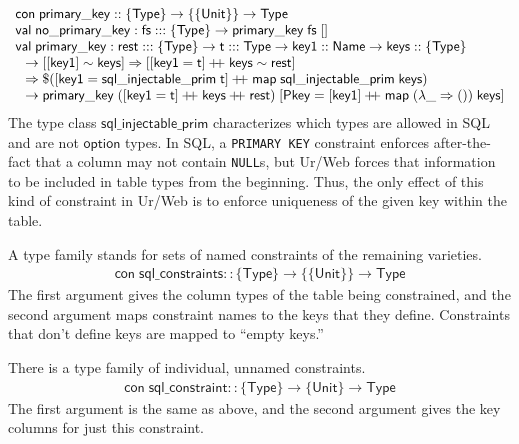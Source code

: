 \documentclass{article}
\newcommand{\mt}[1]{\mathsf{#1}}
\newcommand{\rc}{+ \hspace{-.075in} + \;}
\begin{document}
$$\begin{array}{l}
  \mt{con} \; \mt{primary\_key} :: \{\mt{Type}\} \to \{\{\mt{Unit}\}\} \to \mt{Type} \\
  \mt{val} \; \mt{no\_primary\_key} : \mt{fs} ::: \{\mt{Type}\} \to \mt{primary\_key} \; \mt{fs} \; [] \\
  \mt{val} \; \mt{primary\_key} : \mt{rest} ::: \{\mt{Type}\} \to \mt{t} ::: \mt{Type} \to \mt{key1} :: \mt{Name} \to \mt{keys} :: \{\mt{Type}\} \\
  \hspace{.1in} \to [[\mt{key1}] \sim \mt{keys}] \Rightarrow [[\mt{key1} = \mt{t}] \rc \mt{keys} \sim \mt{rest}] \\
  \hspace{.1in} \Rightarrow \$([\mt{key1} = \mt{sql\_injectable\_prim} \; \mt{t}] \rc \mt{map} \; \mt{sql\_injectable\_prim} \; \mt{keys}) \\
  \hspace{.1in} \to \mt{primary\_key} \; ([\mt{key1} = \mt{t}] \rc \mt{keys} \rc \mt{rest}) \; [\mt{Pkey} = [\mt{key1}] \rc \mt{map} \; (\lambda \_ \Rightarrow ()) \; \mt{keys}]
\end{array}$$
The type class $\mt{sql\_injectable\_prim}$ characterizes which types are allowed in SQL and are not $\mt{option}$ types.  In SQL, a \texttt{PRIMARY KEY} constraint enforces after-the-fact that a column may not contain \texttt{NULL}s, but Ur/Web forces that information to be included in table types from the beginning.  Thus, the only effect of this kind of constraint in Ur/Web is to enforce uniqueness of the given key within the table.

A type family stands for sets of named constraints of the remaining varieties.
$$\begin{array}{l}
  \mt{con} \; \mt{sql\_constraints} :: \{\mt{Type}\} \to \{\{\mt{Unit}\}\} \to \mt{Type}
\end{array}$$
The first argument gives the column types of the table being constrained, and the second argument maps constraint names to the keys that they define.  Constraints that don't define keys are mapped to ``empty keys.''

There is a type family of individual, unnamed constraints.
$$\begin{array}{l}
  \mt{con} \; \mt{sql\_constraint} :: \{\mt{Type}\} \to \{\mt{Unit}\} \to \mt{Type}
\end{array}$$
The first argument is the same as above, and the second argument gives the key columns for just this constraint.
\end{document}
